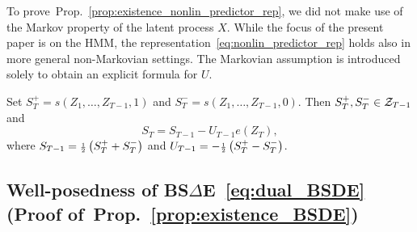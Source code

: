 \documentclass[twoside,11pt]{article}
\def\FRAC#1#2#3{\genfrac{}{}{}{#1}{#2}{#3}}
\def\half{{\mathchoice{\FRAC{1}{1}{2}}%
{\FRAC{2}{1}{2}}%
{\FRAC{3}{1}{2}}%
{\FRAC{4}{1}{2}}}}
\def\clZ{{\cal Z}}
\def\clZ{{\cal Z}}
\def\Thm#1{Thm.~\ref{#1}}
\def\Prop#1{Prop.~\ref{#1}}
\def\clZ{{\cal Z}}
\def\FRAC#1#2#3{\genfrac{}{}{}{#1}{#2}{#3}}
\def\clZ{{\cal Z}}
\begin{document}

\begin{remark}\label{rem:non_Markovian}
  To prove~\Prop{prop:existence_nonlin_predictor_rep}, we did not make
  use of 
  the Markov property of the latent process $X$.  While the focus of
  the present paper is on the HMM, the
  representation~\eqref{eq:nonlin_predictor_rep} holds also in more
  general non-Markovian settings.  The Markovian assumption is
  introduced solely to obtain an explicit formula for $U$.
\end{remark}


\begin{example}[m=1] 
Set $
S_T^{+} = s(Z_1,\hdots,Z_{T-1},1)$ and $S_T^{-} =
s(Z_1,\hdots,Z_{T-1},0)$. 
Then $S_T^{+}, S_T^{-}\in \clZ_{T-1}$ and
\begin{equation*}
S_T = S_{T-1} - U_{T-1} e(Z_T),
\end{equation*}
where $
S_{T-1}=\half\left( S_T^{+} + S_{T}^-\right)$ and $U_{T-1}= -\half\left( S_T^{+} - S_{T}^-\right)$. 
\end{example}





\subsection{Well-posedness of
  BS$\Delta$E~\eqref{eq:dual_BSDE} (Proof of~\Prop{prop:existence_BSDE})}
\label{proof:prop:existence_BSDE}
\end{document}
